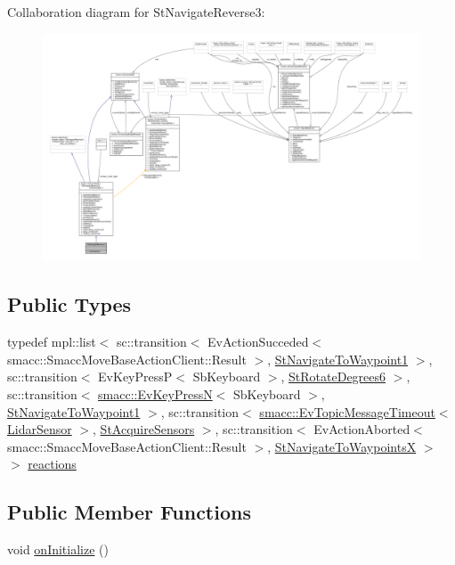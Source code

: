 Collaboration diagram for St\+Navigate\+Reverse3\+:
\nopagebreak
\begin{figure}[H]
\begin{center}
\leavevmode
\includegraphics[width=350pt]{structStNavigateReverse3__coll__graph}
\end{center}
\end{figure}
\subsection*{Public Types}
\begin{DoxyCompactItemize}
\item 
typedef mpl\+::list$<$ sc\+::transition$<$ Ev\+Action\+Succeded$<$ smacc\+::\+Smacc\+Move\+Base\+Action\+Client\+::\+Result $>$, \hyperlink{structStNavigateToWaypoint1}{St\+Navigate\+To\+Waypoint1} $>$, sc\+::transition$<$ Ev\+Key\+PressP$<$ Sb\+Keyboard $>$, \hyperlink{structStRotateDegrees6}{St\+Rotate\+Degrees6} $>$, sc\+::transition$<$ \hyperlink{structsmacc_1_1EvKeyPressN}{smacc\+::\+Ev\+Key\+PressN}$<$ Sb\+Keyboard $>$, \hyperlink{structStNavigateToWaypoint1}{St\+Navigate\+To\+Waypoint1} $>$, sc\+::transition$<$ \hyperlink{structsmacc_1_1EvTopicMessageTimeout}{smacc\+::\+Ev\+Topic\+Message\+Timeout}$<$ \hyperlink{sensor__state_8h_a9db9e1944f88de79507758d08e4a2ee3}{Lidar\+Sensor} $>$, \hyperlink{structStAcquireSensors}{St\+Acquire\+Sensors} $>$, sc\+::transition$<$ Ev\+Action\+Aborted$<$ smacc\+::\+Smacc\+Move\+Base\+Action\+Client\+::\+Result $>$, \hyperlink{structStNavigateToWaypointsX}{St\+Navigate\+To\+WaypointsX} $>$ $>$ \hyperlink{structStNavigateReverse3_ae78d5eb8678ce6a8f7ac772ca2b6ac7a}{reactions}
\end{DoxyCompactItemize}
\subsection*{Public Member Functions}
\begin{DoxyCompactItemize}
\item 
void \hyperlink{structStNavigateReverse3_a4cbaaac42b28f996e98d6b50a9527a89}{on\+Initialize} ()
\end{DoxyCompactItemize}
